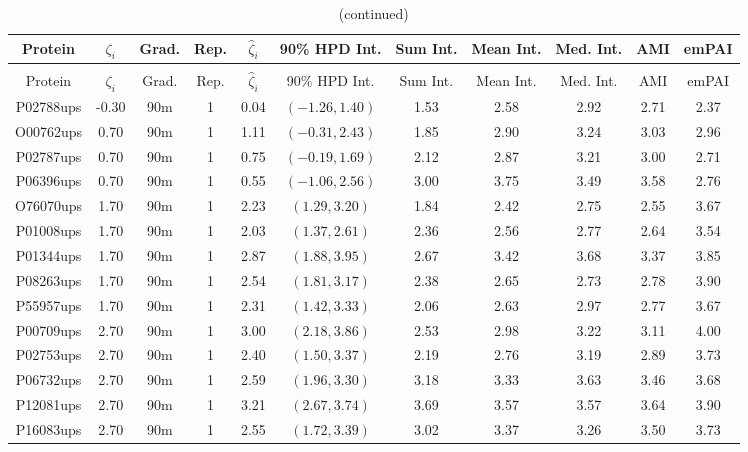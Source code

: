 \begin{landscape}
\begin{longtable}{cccc|cc|ccccc}
\caption{Detailed empirical results for UPS2 experiments, 90m gradients
\label{supp:proteomics:tab:ups2_90m}} \\
 Protein & $\zeta_i$ & Grad. & Rep. & $\hat{\zeta}_i$ & 90\% HPD Int. & Sum Int. & Mean Int. & Med. Int. & AMI & emPAI \\
\hline
\endfirsthead
\caption{(continued)} \\
 Protein & $\zeta_i$ & Grad. & Rep. & $\hat{\zeta}_i$ & 90\% HPD Int. & Sum Int. & Mean Int. & Med. Int. & AMI & emPAI \\
\hline
\endhead
P02788ups & -0.30 & 90m &   1 & 0.04 & $(-1.26, 1.40)$ & 1.53 & 2.58 & 2.92 & 2.71 & 2.37 \\ 
  O00762ups & 0.70 & 90m &   1 & 1.11 & $(-0.31, 2.43)$ & 1.85 & 2.90 & 3.24 & 3.03 & 2.96 \\ 
  P02787ups & 0.70 & 90m &   1 & 0.75 & $(-0.19, 1.69)$ & 2.12 & 2.87 & 3.21 & 3.00 & 2.71 \\ 
  P06396ups & 0.70 & 90m &   1 & 0.55 & $(-1.06, 2.56)$ & 3.00 & 3.75 & 3.49 & 3.58 & 2.76 \\ 
  O76070ups & 1.70 & 90m &   1 & 2.23 & $(1.29, 3.20)$ & 1.84 & 2.42 & 2.75 & 2.55 & 3.67 \\ 
  P01008ups & 1.70 & 90m &   1 & 2.03 & $(1.37, 2.61)$ & 2.36 & 2.56 & 2.77 & 2.64 & 3.54 \\ 
  P01344ups & 1.70 & 90m &   1 & 2.87 & $(1.88, 3.95)$ & 2.67 & 3.42 & 3.68 & 3.37 & 3.85 \\ 
  P08263ups & 1.70 & 90m &   1 & 2.54 & $(1.81, 3.17)$ & 2.38 & 2.65 & 2.73 & 2.78 & 3.90 \\ 
  P55957ups & 1.70 & 90m &   1 & 2.31 & $(1.42, 3.33)$ & 2.06 & 2.63 & 2.97 & 2.77 & 3.67 \\ 
  P00709ups & 2.70 & 90m &   1 & 3.00 & $(2.18, 3.86)$ & 2.53 & 2.98 & 3.22 & 3.11 & 4.00 \\ 
  P02753ups & 2.70 & 90m &   1 & 2.40 & $(1.50, 3.37)$ & 2.19 & 2.76 & 3.19 & 2.89 & 3.73 \\ 
  P06732ups & 2.70 & 90m &   1 & 2.59 & $(1.96, 3.30)$ & 3.18 & 3.33 & 3.63 & 3.46 & 3.68 \\ 
  P12081ups & 2.70 & 90m &   1 & 3.21 & $(2.67, 3.74)$ & 3.69 & 3.57 & 3.57 & 3.64 & 3.90 \\ 
  P16083ups & 2.70 & 90m &   1 & 2.55 & $(1.72, 3.39)$ & 3.02 & 3.37 & 3.26 & 3.50 & 3.73 \\ 

\end{longtable}
\end{landscape}
